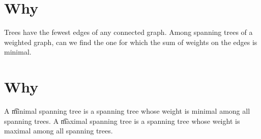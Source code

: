 

\section*{Why}

Trees have the fewest edges of any connected graph.
Among spanning trees of a weighted graph, can we find the one for which the sum of weights on the edges is minimal.

\section*{Why}

A \t{minimal spanning tree} is a spanning tree whose weight is minimal among all spanning trees.
A \t{maximal spanning tree} is a spanning tree whose weight is maximal among all spanning trees.

\blankpage
